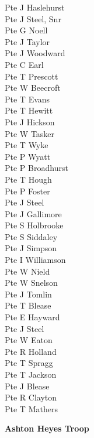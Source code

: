 \begin{multicols}{2}
  Pte J Haslehurst \\
  Pte J Steel, Snr \\
  Pte G Noell \\
  Pte J Taylor \\
  Pte J Woodward \\
  Pte C Earl \\
  Pte T Prescott \\
  Pte W Beecroft \\
  Pte T Evans \\
  Pte T Hewitt \\
  Pte J Hickson \\
  Pte W Tasker \\
  Pte T Wyke \\
  Pte P Wyatt \\
  Pte P Broadhurst \\
  Pte T Hough \\
  Pte P Foster \\
  Pte J Steel \\
  Pte J Gallimore \\
  Pte S Holbrooke \\
  Pte S Siddaley \\
  Pte J Simpson \\
  Pte I Williamson \\
  Pte W Nield \\
  Pte W Snelson \\
  Pte J Tomlin \\
  Pte T Blease \\
  Pte E Hayward \\
  Pte J Steel \\
  Pte W Eaton \\
  Pte R Holland \\
  Pte T Spragg \\
  Pte T Jackson \\
  Pte J Blease \\
  Pte R Clayton \\
  Pte T Mathers \\
\end{multicols}

\begin{center}
  \Large
  \textbf{Ashton Heyes Troop}
\end{center}

